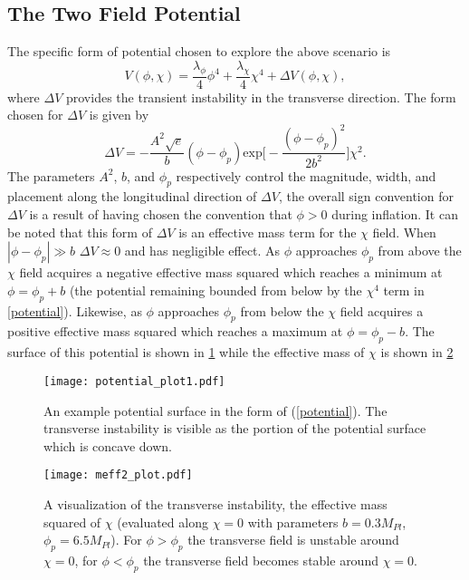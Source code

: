 \documentclass[letterpaper,11pt]{article}
\begin{document}
\subsection{The Two Field Potential}
The specific form of potential chosen to explore the above scenario is
\begin{equation}
V(\phi, \chi) = \frac{\lambda_{\phi}}{4}\phi^4 + \frac{\lambda_{\chi}}{4}\chi^4 + \Delta V(\phi, \chi), \label{potential}
\end{equation}
where $\Delta V$ provides the transient instability in the transverse direction. The form chosen for $\Delta V$ is given by
\begin{equation}
\Delta V = -\frac{A^2\sqrt{e}}{b}(\phi - \phi_p)\mathrm{exp}\bigg[-\frac{(\phi-\phi_p)^2}{2b^2}\bigg]\chi^2. \label{dv}
\end{equation}
The parameters $A^2$, $b$, and $\phi_p$ respectively control the magnitude, width, and placement along the longitudinal direction of $\Delta V$, the overall sign convention for $\Delta V$ is a result of having chosen the convention that $\phi>0$ during inflation. It can be noted that this form of $\Delta V$ is an effective mass term for the $\chi$ field. When $|\phi-\phi_p| \gg b$ $\Delta V \approx 0$ and has negligible effect. As $\phi$ approaches $\phi_p$ from above the $\chi$ field acquires a negative effective mass squared which reaches a minimum at $\phi = \phi_p + b$ (the potential remaining bounded from below by the $\chi^4$ term in \ref{potential}). Likewise, as $\phi$ approaches $\phi_p$ from below the $\chi$ field acquires a positive effective mass squared which reaches a maximum at $\phi = \phi_p - b$. The surface of this potential is shown in \ref{potential plot} while the effective mass of $\chi$ is shown in \ref{meff2 plot}

\begin{figure}
\begin{center}
\texttt{[image: potential\_plot1.pdf]}
\caption{An example potential surface in the form of (\ref{potential}). The transverse instability is visible as the portion of the potential surface which is concave down.}
\label{potential plot}
\end{center}
\end{figure}

\begin{figure}
\begin{center}
\texttt{[image: meff2\_plot.pdf]}
\caption{A visualization of the transverse instability, the effective mass squared of $\chi$ (evaluated along $\chi=0$ with parameters $b=0.3M_{Pl}$, $\phi_p=6.5M_{Pl}$). For $\phi>\phi_p$ the transverse field is unstable around $\chi=0$, for $\phi<\phi_p$ the transverse field becomes stable around $\chi=0$.}%
\label{meff2 plot}
\end{center}
\end{figure}
\end{document}
